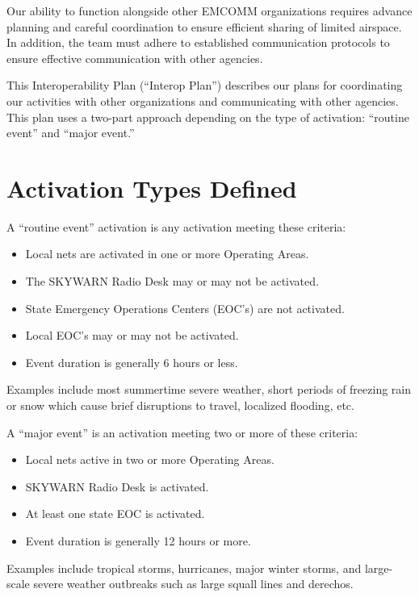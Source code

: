 \documentclass[pdflatex,letterpaper,twoside,12pt]{book}
\begin{document}
Our ability to function alongside other EMCOMM organizations requires advance planning and careful coordination to ensure efficient sharing of limited airspace.  In addition, the team must adhere to established communication protocols to ensure effective communication with other agencies.

This Interoperability Plan (``Interop Plan'') describes our plans for coordinating our activities with other organizations and communicating with other agencies.  This plan uses a two-part approach depending on the type of activation:  ``routine event'' and ``major event.''


\section{Activation Types Defined}

A ``routine event'' activation is any activation meeting these criteria:

\begin{itemize}
\item Local nets are activated in one or more Operating Areas.
\item The SKYWARN Radio Desk may or may not be activated.
\item State Emergency Operations Centers (EOC's) are not activated.
\item Local EOC's may or may not be activated.
\item Event duration is generally 6 hours or less.
\end{itemize}

Examples include most summertime severe weather, short periods of freezing rain or snow which cause brief disruptions to travel, localized flooding, etc.

A ``major event'' is an activation meeting two or more of these criteria:

\begin{itemize}
\item Local nets active in two or more Operating Areas.
\item SKYWARN Radio Desk is activated.
\item At least one state EOC is activated.
\item Event duration is generally 12 hours or more.
\end{itemize}

Examples include tropical storms, hurricanes, major winter storms, and large-scale severe weather outbreaks such as large squall lines and derechos.
\end{document}
